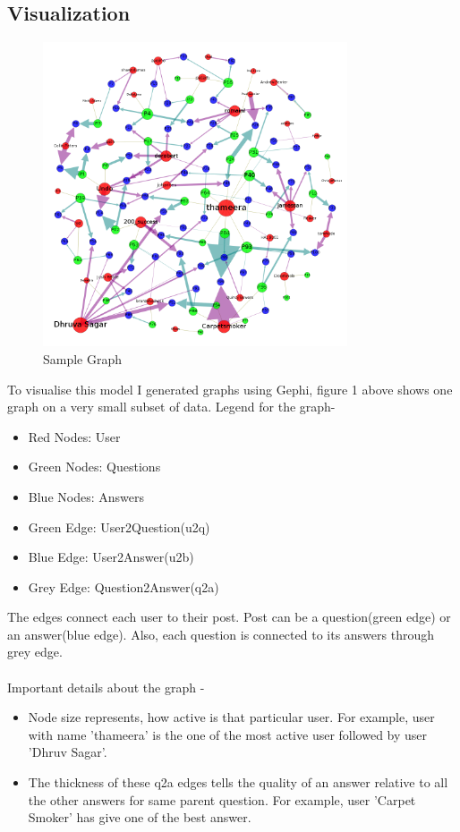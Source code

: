 \documentclass{article}
\begin{document}
\subsection{Visualization}
\begin{figure}[h]
\centering
\includegraphics[width=9cm]{proposalimg.png}
\caption{Sample Graph}
\label{fig1:overview}
\end{figure}
To visualise this model I generated graphs using Gephi, figure 1 above
shows one graph on a very small subset of data. Legend for the graph-
\begin{itemize}
    \item Red Nodes: User
    \item Green Nodes: Questions
    \item Blue Nodes: Answers
    \item Green Edge: User2Question(u2q)
    \item Blue Edge: User2Answer(u2b)
    \item Grey Edge: Question2Answer(q2a)
\end{itemize}
The edges connect each user to their post.
Post can be a question(green edge) or an answer(blue edge).
Also, each question is connected to its answers through grey edge.\\
\\
Important details about the graph -
\begin{itemize}
    \item Node size represents, how active is that particular user. For example, user
        with name 'thameera' is the one of the most active user followed by user
        'Dhruv Sagar'.
    \item The thickness of these q2a edges tells the quality of an answer relative to 
all the other answers for same parent question. For example, user 'Carpet Smoker' has
        give one of the best answer.
\end{itemize}
\end{document}
